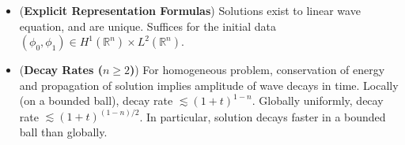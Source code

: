 \documentclass{article}
\begin{document}
\begin{itemize}
	\item (\textbf{Explicit Representation Formulas}) Solutions exist to linear wave equation, and are unique. Suffices for the initial data $(\phi_{0}, \phi_{1}) \in H^{1}(\mathbb{R}^{n}) \times L^{2}(\mathbb{R}^{n})$. 
	
	\item (\textbf{Decay Rates ($n\geq 2$)}) For homogeneous problem, conservation of energy and propagation of solution implies amplitude of wave decays in time. Locally (on a bounded ball), decay rate $\lesssim (1 + t)^{1 - n}$. Globally uniformly, decay rate $\lesssim (1 + t)^{(1 - n)/2}$. In particular, solution decays faster in a bounded ball than globally. 
\end{itemize}
	
	
  
\end{document}
